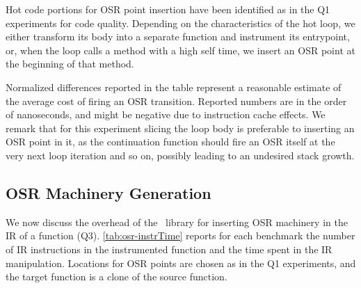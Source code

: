 \noindent Hot code portions for OSR point insertion have been identified as in the Q1 experiments for code quality. Depending on the characteristics of the hot loop, we either transform its body into a separate function and instrument its entrypoint, or, when the loop calls a method with a high self time, we insert an OSR point at the beginning of that method.

Normalized differences reported in the table represent a reasonable estimate of the average cost of firing an OSR transition.
Reported numbers are in the order of nanoseconds, and might be negative due to instruction cache effects. We remark that for this experiment slicing the loop body is preferable to inserting an OSR point in it, as the continuation function should fire an OSR itself at the very next loop iteration and so on, possibly leading to an undesired stack growth.

\subsection{OSR Machinery Generation}

We now discuss the overhead of the \osrkit\ library for inserting OSR machinery in the IR of a function (Q3). \mytable\ref{tab:osr-instrTime} reports for each benchmark the number of IR instructions in the instrumented function and the time spent in the IR manipulation. Locations for OSR points are chosen as in the Q1 experiments, and the target function is a clone of the source function.

